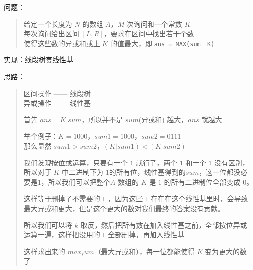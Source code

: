 \documentclass[E:/GsjzTle/main/main.tex]{subfiles}
\begin{document}
问题：

\begin{quote}
给定一个长度为 \(N\) 的数组 \(A\)，\(M\) 次询问和一个常数 \(K\)\\
每次询问给出区间 \([L,R]\)，要求在区间中找出若干个数\\
使得这些数的异或和或上 \(K\) 的值最大，即
\texttt{ans\ =\ MAX(sum\ \textbar{}\ K)}
\end{quote}

实现：线段树套线性基

思路：

\begin{quote}
区间操作 ------ 线段树\\
异或操作 ------ 线性基

首先 \(ans=K|sum\)，所以并不是 \(sum\)(异或和) 越大，\(ans\) 就越大

举个例子：\(K = 1000\)，\(sum1 = 1000\)，\(sum2 = 0111\)\\
那么显然 \(sum1 > sum2\)，\((K|sum1) < (K|sum2)\)

我们发现按位或运算，只要有一个 \(1\) 就行了，两个 \(1\) 和一个 \(1\)
没有区别，所以对于 \(K\) 中二进制下为
\(1\)的所有位，线性基得到的\(sum\)，这一位都没必要是1，所以我们可以把整个\(A\)
数组的 \(K\) 是 \(1\) 的所有二进制位全部变成 \(0\)。

这样等于删掉了不需要的 \(1\) ，因为这些 \(1\)
存在在这个线性基里时，会导致最大异或和更大，但是这个更大的数对我们最终的答案没有贡献。

所以我们可以将 \(k\)
取反，然后把所有数在加入线性基之前，全部按位异或运算一遍，这样把没用的
\(1\) 全部删掉，再加入线性基

这样求出来的 \(max_sum\)（最大异或和），每一位都能使得 \(K\)
变为更大的数了
\end{quote}
\end{document}
